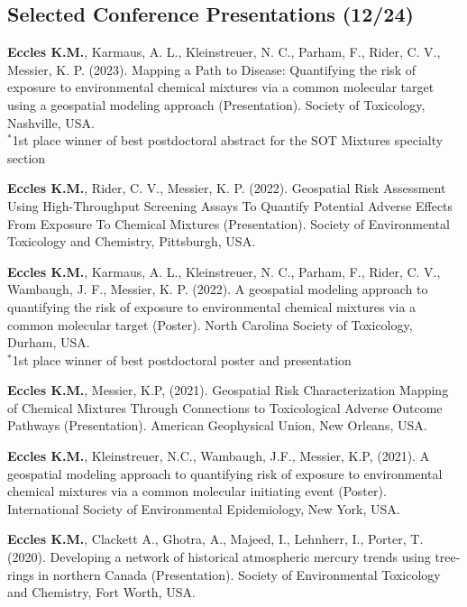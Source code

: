 \documentclass[margin,line]{res}
\begin{document}
\begin{resume}
\vspace*{.1in}
\section{\sc Selected Conference Presentations (12/24)}

\begin{etaremune}[start=12]

\item \textbf{Eccles K.M.}, Karmaus, A. L., Kleinstreuer, N. C., Parham, F., Rider, C. V., Messier, K. P. (2023). Mapping a Path to Disease: Quantifying the risk of exposure to environmental chemical mixtures via a common molecular target using a geospatial modeling approach (Presentation). Society of Toxicology, Nashville, USA.\\
$^{*}$1st place winner of best postdoctoral abstract for the SOT Mixtures specialty section

\item \textbf{Eccles K.M.}, Rider, C. V., Messier, K. P. (2022). Geospatial Risk Assessment Using High-Throughput Screening Assays To Quantify Potential Adverse Effects From Exposure To Chemical Mixtures (Presentation). Society of Environmental Toxicology and Chemistry, Pittsburgh, USA.

\item \textbf{Eccles K.M.}, Karmaus, A. L., Kleinstreuer, N. C., Parham, F., Rider, C. V., Wambaugh, J. F., Messier, K. P. (2022). A geospatial modeling approach to quantifying the risk of exposure to environmental chemical mixtures via a common molecular target (Poster). North Carolina Society of Toxicology, Durham, USA.\\
$^{*}$1st place winner of best postdoctoral poster and presentation

\item \textbf{Eccles K.M.}, Messier, K.P, (2021). Geospatial Risk Characterization Mapping of Chemical Mixtures Through Connections to Toxicological Adverse Outcome Pathways (Presentation). American Geophysical Union, New Orleans, USA.

\item \textbf{Eccles K.M.}, Kleinstreuer, N.C., Wambaugh, J.F., Messier, K.P, (2021). A geospatial modeling approach to quantifying risk of exposure to environmental chemical mixtures via a common molecular initiating event (Poster). International Society of Environmental Epidemiology, New York, USA.

\item \textbf{Eccles K.M.}, Clackett A., Ghotra, A., Majeed, I., Lehnherr, I., Porter, T. (2020). Developing a network of historical atmospheric mercury trends using tree-rings in northern Canada (Presentation).  Society of Environmental Toxicology and Chemistry, Fort Worth, USA.


\end{etaremune}
\end{resume}
\end{document}

